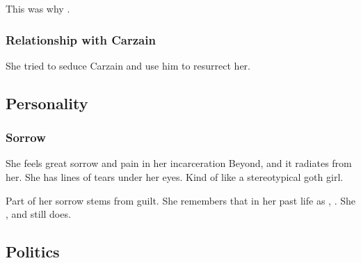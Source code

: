 This was why . 





\subsubsection{Relationship with Carzain}
She tried to seduce Carzain and use him to resurrect her. 










\subsection{Personality}





\subsubsection{Sorrow}
She feels great sorrow and pain in her incarceration Beyond, and it radiates from her. 
She has lines of tears under her eyes. 
Kind of like a stereotypical goth girl.

Part of her sorrow stems from guilt. 
She remembers that in her past life as \Delphine, .
She , and still does. 









\subsection{Politics}





